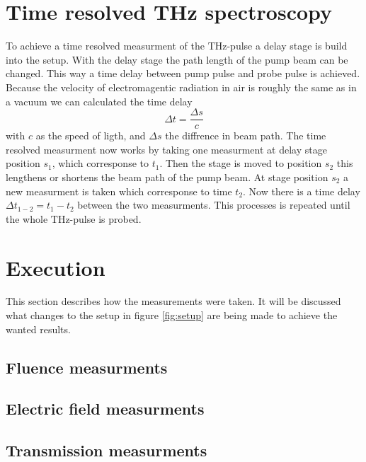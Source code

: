\section{Time resolved THz spectroscopy}
\label{sec:time_domain}
To achieve a time resolved measurment of the $\si{\tera\hertz}$-pulse a delay stage is build into the setup.
With the delay stage the path length of the pump beam can be changed.
This way a time delay between pump pulse and probe pulse is achieved.
Because the velocity of electromagentic radiation in air is roughly the same as in a vacuum we can calculated the time delay   
\begin{equation}
    \Delta t = \frac{\Delta s}{c}
\end{equation}
with $c$ as the speed of ligth, and $\Delta s$ the diffrence in beam path.
The time resolved measurment now works by taking one measurment at delay stage position $s_1$, which corresponse to $t_1$.
Then the stage is moved to position $s_2$ this lengthens or shortens the beam path of the pump beam.
At stage position $s_2$ a new measurment is taken which corresponse to time $t_2$.
Now there is a time delay $\Delta t_{1-2} = t_1 - t_2$ between the two measurments.
This processes is repeated until the whole $\si{\tera\hertz}$-pulse is probed.

\section{Execution}
This section describes how the measurements were taken. 
It will be discussed what changes to the setup in figure \ref{fig:setup} are being made to achieve the wanted results.
\subsection{Fluence measurments}

\subsection{Electric field measurments}

\subsection{Transmission measurments}